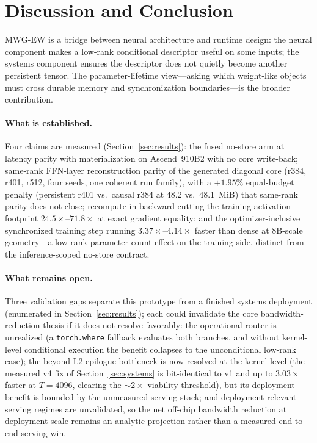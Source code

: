 \section{Discussion and Conclusion}
\label{sec:conclusion}

\textsc{MWG-EW} is a bridge between neural architecture and runtime design:
the neural component makes a low-rank conditional descriptor useful on some
inputs; the systems component ensures the descriptor does not quietly become
another persistent tensor. The parameter-lifetime view---asking which
weight-like objects must cross durable memory and synchronization
boundaries---is the broader contribution.

\paragraph{What is established.}
Four claims are measured (Section~\ref{sec:results}): the fused no-store
arm at latency parity with materialization on Ascend~910B2 with no core
write-back; same-rank FFN-layer reconstruction parity of the generated
diagonal core
(r384, r401, r512, four seeds, one coherent run family), with a
$+1.95\%$ equal-budget penalty (persistent r401 vs.\ causal r384 at
48.2 vs.\ 48.1~MiB) that same-rank parity does not close; recompute-in-backward cutting the training activation
footprint $24.5\times$--$71.8\times$ at exact gradient equality; and the
optimizer-inclusive synchronized training step running
$3.37\times$--$4.14\times$ faster than dense at 8B-scale geometry---a
low-rank parameter-count effect on the training side, distinct from the
inference-scoped no-store contract.

\paragraph{What remains open.}
Three validation gaps separate this prototype from a finished systems
deployment (enumerated in Section~\ref{sec:results}); each could
invalidate the core bandwidth-reduction thesis if it does not resolve
favorably: the operational router is unrealized (a
\texttt{torch.where} fallback evaluates both branches, and without
kernel-level conditional execution the benefit collapses to the
unconditional low-rank case); the beyond-L2 epilogue bottleneck is now
resolved at the kernel level (the measured v4 fix of
Section~\ref{sec:systems} is bit-identical to v1 and up to $3.03\times$
faster at $T{=}4096$, clearing the ${\sim}2\times$ viability threshold),
but its deployment benefit is bounded by the unmeasured serving stack;
and deployment-relevant serving
regimes are unvalidated, so the net off-chip bandwidth reduction at
deployment scale remains an analytic projection rather than a measured
end-to-end serving win.

